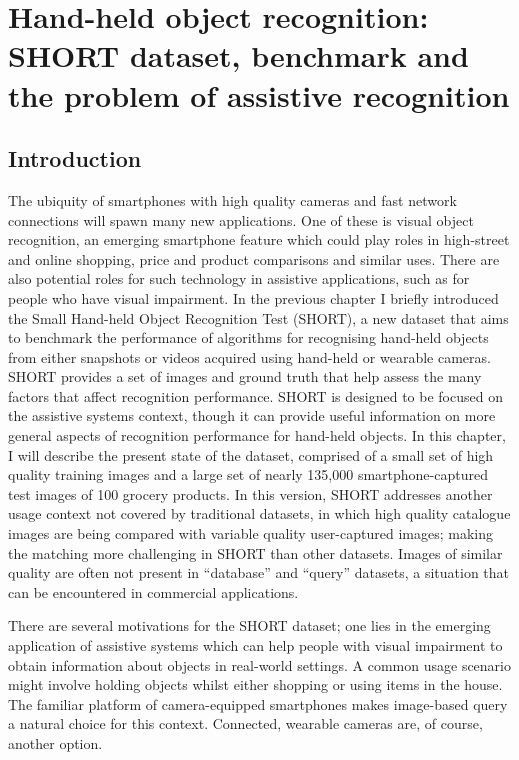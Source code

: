 \chapter{Hand-held object recognition: SHORT dataset, benchmark and the problem of assistive recognition}\label{ch:chapterSHORT}


\section{Introduction}
\label{sec:intro}

The ubiquity of smartphones with high quality cameras and fast network connections will spawn many new applications. One of these is visual object recognition, an emerging smartphone feature which could play roles in high-street and online shopping, price and product comparisons and similar uses. There are also potential roles for such technology in assistive applications, such as for people who have visual impairment. In the previous chapter I briefly introduced the Small Hand\--held Object Re\-cog\-ni\-tion Test (SHORT), a new dataset that aims to benchmark the performance of algorithms for recognising hand-held objects from either snapshots or videos acquired using hand-held or wearable cameras. SHORT provides a set of images and ground truth that help assess the many factors that affect recognition performance. SHORT is designed to be focused on the assistive systems context, though it can provide useful information on more general aspects of recognition performance for hand-held objects. In this chapter, I will describe the present state of the dataset, comprised of a small set of high quality training images and a large set of nearly 135,000 smartphone-captured test images of 100 grocery products. In this version, SHORT addresses another usage context not covered by traditional datasets, in which high quality catalogue images are being compared with variable quality user-captured images; making the matching more challenging in SHORT than other datasets. Images of similar quality are often not present in ``database'' and ``query'' datasets, a situation that can be encountered in commercial applications. 

There are several motivations for the SHORT dataset; one lies in the emerging application of assistive systems which can help people with visual impairment to obtain information about objects in real-world settings. A common usage scenario might involve holding objects whilst either shopping or using items in the house. The familiar platform of camera-equipped smartphones makes image-based query a natural choice for this context. Connected, wearable cameras are, of course, another option.

